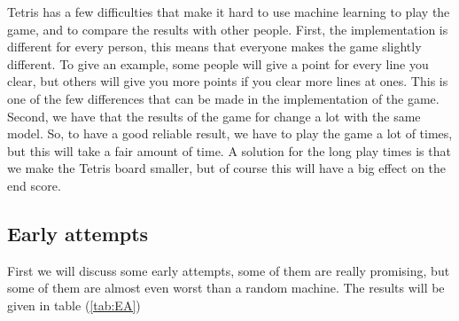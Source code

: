 \documentclass{report}
\begin{document}
Tetris has a few difficulties that make it hard to use machine learning to play the game, and to compare the results with other people. First, the implementation is different for every person, this means that everyone makes the game slightly different. To give an example, some people will give a point for every line you clear, but others will give you more points if you clear more lines at ones. This is one of the few differences that can be made in the implementation of the game. Second, we have that the results of the game for change a lot with the same model. So, to have a good reliable result, we have to play the game a lot of times, but this will take a fair amount of time. A solution for the long play times is that we make the Tetris board smaller, but of course this will have a big effect on the end score.

\subsection{Early attempts}
First we will discuss some early attempts, some of them are really promising, but some of them are almost even worst than a random machine. The results will be given in table (\ref{tab:EA})
\end{document}
